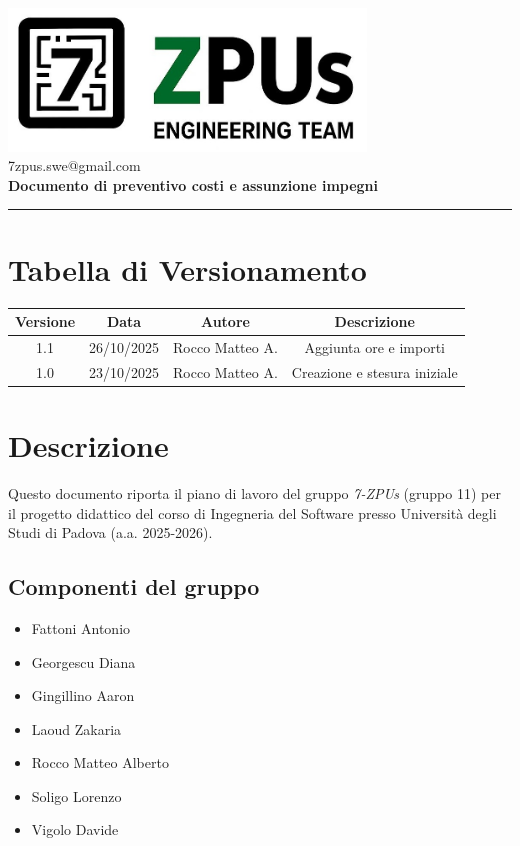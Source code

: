 \documentclass[a4paper,12pt]{article}
\begin{document}
\begin{center}
    \includegraphics[width=9.5cm]{../assets/logo7ZPUs.jpg}\\
    \small\hspace{10cm} 7zpus.swe@gmail.com\\
    \vspace{0.5cm}
    \Large \textbf{Documento di preventivo costi e assunzione impegni}\\
    \vspace{0.2cm}
\end{center}

\vspace{0.3cm}
\hrule
\vspace{0.3cm}

\tableofcontents

\newpage

\section*{Tabella di Versionamento}
    \begin{tabular}{|c|c|c|c|}
        \hline
        \textbf{Versione} & \textbf{Data} & \textbf{Autore} & \textbf{Descrizione} \\
        \hline
        1.1 & 26/10/2025 & Rocco Matteo A. & Aggiunta ore e importi \\
        \hline
        1.0 & 23/10/2025 & Rocco Matteo A. & Creazione e stesura iniziale \\
        \hline
    \end{tabular}

\section{Descrizione}
Questo documento riporta il piano di lavoro del gruppo \textit{7-ZPUs} (gruppo 11) per il progetto didattico del corso di Ingegneria del Software presso Università degli Studi di Padova (a.a. 2025-2026).

\subsection*{Componenti del gruppo}
\begin{itemize}[noitemsep]
    \item Fattoni Antonio 
    \item Georgescu Diana
    \item Gingillino Aaron
    \item Laoud Zakaria
    \item Rocco Matteo Alberto
    \item Soligo Lorenzo
    \item Vigolo Davide
\end{itemize}
\end{document}
